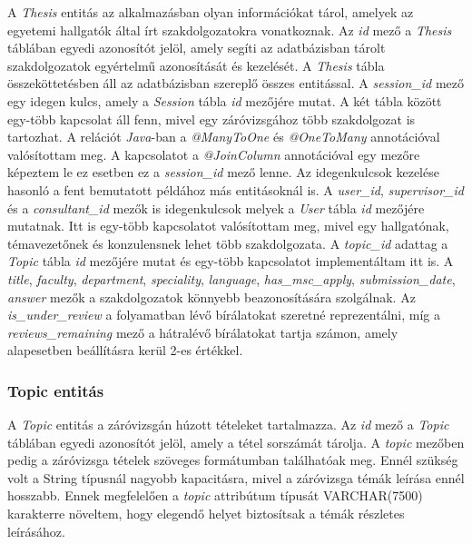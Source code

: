 A \textit{Thesis} entitás az alkalmazásban olyan információkat tárol, amelyek az egyetemi hallgatók által írt szakdolgozatokra vonatkoznak. Az \textit{id} mező a \textit{Thesis} táblában egyedi azonosítót jelöl, amely segíti az adatbázisban tárolt szakdolgozatok egyértelmű azonosítását és kezelését. A \textit{Thesis} tábla összeköttetésben áll az adatbázisban szereplő összes entitással. A \textit{session\_id} mező egy idegen kulcs, amely a \textit{Session} tábla \textit{id} mezőjére mutat. A két tábla között egy-több kapcsolat áll fenn, mivel egy záróvizsgához több szakdolgozat is tartozhat. A relációt \textit{Java}-ban \cite{java} a \textit{@ManyToOne} és \textit{@OneToMany} annotációval valósítottam meg. A kapcsolatot a \textit{@JoinColumn} annotációval egy mezőre képeztem le ez esetben ez a \textit{session\_id} mező lenne. Az idegenkulcsok kezelése hasonló a fent bemutatott példához más entitásoknál is. A \textit{user\_id}, \textit{supervisor\_id} és a \textit{consultant\_id} mezők is idegenkulcsok melyek a \textit{User} tábla \textit{id} mezőjére mutatnak. Itt is egy-több kapcsolatot valósítottam meg, mivel egy hallgatónak, témavezetőnek és konzulensnek lehet több szakdolgozata. A \textit{topic\_id} adattag a \textit{Topic} tábla \textit{id} mezőjére mutat és egy-több kapcsolatot implementáltam itt is. A \textit{title}, \textit{faculty}, \textit{department}, \textit{speciality}, \textit{language}, \textit{has\_msc\_apply}, \textit{submission\_date}, \textit{answer} mezők a szakdolgozatok könnyebb beazonosítására szolgálnak. Az \textit{is\_under\_review} a folyamatban lévő bírálatokat szeretné reprezentálni, míg a \textit{reviews\_remaining} mező a hátralévő bírálatokat tartja számon, amely alapesetben beállításra kerül 2-es értékkel.

\subsubsection{Topic entitás}

A \textit{Topic} entitás a záróvizsgán húzott tételeket tartalmazza. Az \textit{id} mező a \textit{Topic} táblában egyedi azonosítót jelöl, amely a tétel sorszámát tárolja. A \textit{topic} mezőben pedig a záróvizsga tételek szöveges formátumban találhatóak meg. Ennél szükség volt a String típusnál nagyobb kapacitásra, mivel a záróvizsga témák leírása ennél hosszabb. Ennek megfelelően a \textit{topic} attribútum típusát VARCHAR(7500) karakterre növeltem, hogy elegendő helyet biztosítsak a témák részletes leírásához.

